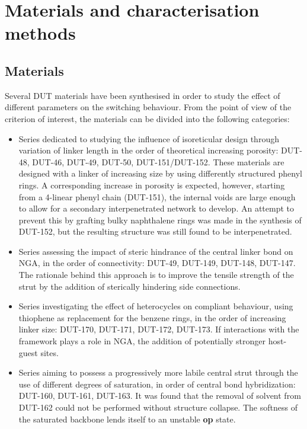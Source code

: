 
\section{Materials and characterisation methods}

\subsection{Materials}

Several DUT materials have been synthesised in order to 
study the effect of different parameters on the switching 
behaviour. From the point of view of the criterion of interest,
the materials can be divided into the following categories:

\begin{itemize}
    \item Series dedicated to studying the influence of isoreticular
    design through variation of linker length in the order of 
    theoretical increasing porosity: DUT-48, DUT-46, DUT-49, 
    DUT-50, DUT-151/DUT-152. These materials are designed 
    with a linker of increasing size by using differently 
    structured phenyl rings. A corresponding increase in 
    porosity is expected, however, starting from a 4-linear
    phenyl chain (DUT-151), the internal voids are large enough to 
    allow for a secondary interpenetrated network to develop.
    An attempt to prevent this by grafting bulky naphthalene 
    rings was made in the synthesis of DUT-152, but the resulting 
    structure was still found to be interpenetrated.
    
    \item Series assessing the impact of steric hindrance of the 
    central linker bond on NGA, in the order of connectivity:
    DUT-49, DUT-149, DUT-148, DUT-147. The rationale behind this
    approach is to improve the tensile strength of the strut by 
    the addition of sterically hindering side connections.

    \item Series investigating the effect of heterocycles on compliant
    behaviour, using thiophene as replacement for the benzene rings, 
    in the order of increasing linker size: DUT-170, DUT-171, DUT-172,
    DUT-173. If interactions with the framework plays a role in NGA,
    the addition of potentially stronger host-guest sites.

    \item Series aiming to possess a progressively more labile central 
    strut through the use of different degrees of saturation,
    in order of central bond hybridization: DUT-160, DUT-161, DUT-163.
    It was found that the removal of solvent from DUT-162 could not be 
    performed without structure collapse. The softness of the saturated
    backbone lends itself to an unstable \textbf{op} state.


\end{itemize}
